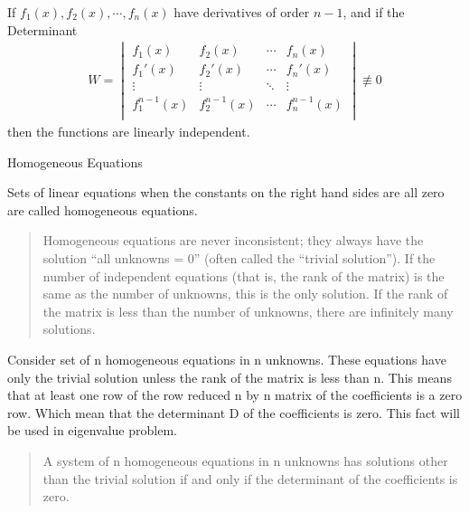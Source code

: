 \documentclass[../main.tex]{subfiles}
\begin{document}
If $f_1(x), f_2(x),\cdots, f_n(x)$ have derivatives of order $n - 1$, and if the Determinant
\begin{align*}
    W=\begin{vmatrix}
        f_1(x)& f_2(x)&\cdots& f_n(x)\\
        f_1'(x)& f_2'(x)&\cdots& f_n'(x)\\
        \vdots&\vdots&\ddots& \vdots\\
        f_1^{n-1}(x)& f_2^{n-1}(x)&\cdots& f_n^{n-1}(x)\\
    \end{vmatrix}\not\equiv0
\end{align*}then the functions are linearly independent.

Homogeneous Equations
\begin{definition}
    Sets of linear equations when the constants on the right hand sides are all zero are called homogeneous equations.
\end{definition}
\begin{quotation}
    Homogeneous equations are never inconsistent; they always have the solution “all unknowns = 0” (often called the “trivial solution”). 
If the number of independent equations (that is, the rank of the matrix) is the same as the number of unknowns, this is the only solution. 
If the rank of the matrix is less than the number of unknowns, there are infinitely many solutions.
\end{quotation}
Consider set of n homogeneous equations in n unknowns.
These equations have only the trivial solution unless the rank of the matrix is less than n. 
This means that at least one row of the row reduced n by n matrix of the coefficients is a zero row. 
Which mean that the determinant D of the coefficients is zero.
This fact will be used in eigenvalue problem.
\begin{quote}
    A system of n homogeneous equations in n unknowns has solutions
other than the trivial solution if and only if the determinant of the
coefficients is zero.
\end{quote}
\end{document}

